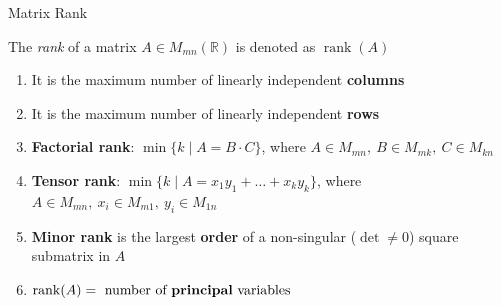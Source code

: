 \documentclass[fullscreen=true, bookmarks=true, hyperref={pdfencoding=unicode}]{beamer}
\begin{document}
\begin{frame}{Matrix Rank}
  \begin{definition}
    The \emph{rank} of a matrix $A \in M_{mn}(\mathbb{R})$ is denoted as $\operatorname{rank}(A)$
  \end{definition}

  \begin{enumerate}
    \item It is the maximum number of linearly independent \textbf{columns}
    \pause
    \item It is the maximum number of linearly independent \textbf{rows}
    \pause
    \item \textbf{Factorial rank}: $\min \{k \mid A = B\cdot C\}$, where  
    $A \in M_{mn},\  B \in M_{mk},\  C \in M_{kn}$
    \pause
    \item \textbf{Tensor rank}: $\min \{k \mid A = x_1y_1 + \ldots + x_ky_k\}$, 
    where $A \in M_{mn},\  x_i \in M_{m1},\  y_i \in M_{1n}$
    \pause
    \item \textbf{Minor rank} is the largest \textbf{order} of a non-singular ($\det \neq 0$)
    square submatrix in $A$
    \item $\operatorname{rank}(A) = \text{ number of {\bf principal} variables }$
  \end{enumerate}
\end{frame}
\end{document}
